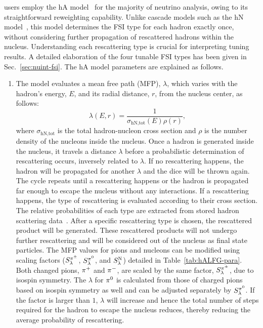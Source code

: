 \genie users employ the hA model~\cite{Andreopoulos:2015wxa} for the majority of neutrino analysis, owing to its straightforward reweighting capability. 
Unlike cascade models such as the hN model~\cite{Andreopoulos:2015wxa}, this model determines the FSI type for each hadron exactly once, without considering further propagation of rescattered hadrons within the nucleus. 
Understanding each rescattering type is crucial for interpreting tuning results.
A detailed elaboration of the four tunable FSI types has been given in Sec.~\ref{sec:nuint-fsi}. 
The hA model parameters are explained as follows.

\begin{enumerate}
    \item 
    The model evaluates a mean free path (MFP), $\lambda$, which varies with the hadron's energy, $E$, and its radial distance, $r$, from the nucleus center,  as follows:
    \begin{equation}
        \lambda(E,r) = \frac{1}{\sigma_\textrm{hN,tot}(E)\rho(r)},
    \end{equation}
    where $\sigma_\textrm{hN,tot}$ is the total hadron-nucleon cross section and $\rho$ is the number density of the nucleons inside the nucleus. Once a hadron is generated inside the nucleus, it travels a distance $\lambda$ before a probabilistic determination of rescattering occurs, inversely related to  $\lambda$. If no rescattering happens, the hadron will be propagated for another $\lambda$ and the dice will be thrown again. The cycle repeats until a rescattering happens or the hadron is propagated far enough to escape the nucleus without any interactions. If a rescattering happens, the type of rescattering is evaluated according to their cross section. The relative probabilities of each type are extracted from stored hadron scattering data~\cite{LADS:1999dyv,Navon:1983xj,Carroll:1976hj,Clough:1974qt,BAUHOFF1986429,Mashnik:2000up,Ishibashi:1997gbe}. After a specific rescattering type is chosen, the rescattered product will be generated. These rescattered products will not undergo further rescattering and will be considered out of the nucleus as final state particles.  
    The MFP values for pions and nucleons can be modified using scaling factors  ($S_\lambda^{\pi^{\pm}}$, $S_\lambda^{\pi^{0}}$,  and $S_\lambda^\textrm{N}$) detailed in Table~\ref{tab:hALFG-para}. Both changed pions, $\pi^+$ and $\pi^-$, are scaled by the same factor, $S_\lambda^{\pi^{\pm}}$, due to isospin symmetry. The $\lambda$ for $\pi^0$ is calculated from those of charged pions based on isospin symmetry as well and can be adjusted separately by $S_\lambda^{\pi^{0}}$. If the factor is larger than $1$, $\lambda$ will increase and hence the total number of steps required for the hadron to escape the nucleus reduces, thereby reducing the average probability of rescattering. 

\end{enumerate}
